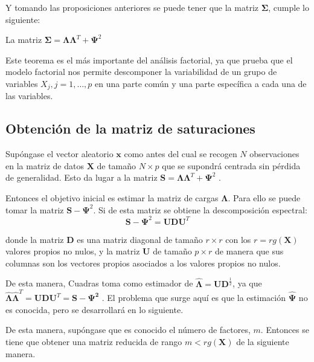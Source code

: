 \noindent Y tomando las proposiciones anteriores se puede tener que la matriz $\mathbf{\Sigma}$, cumple lo siguiente:
\begin{teorema}\label{Descomposición Varianza}
La matriz $\mathbf{\Sigma}=\mathbf{\Lambda}\mathbf{\Lambda}^T+\mathbf{\Psi}^2$
\end{teorema}

\noindent Este teorema es el más importante del análisis factorial, ya que   prueba que el modelo factorial nos permite descomponer la variabilidad de un grupo de variables $X_j,j=1, \ldots , p$ en una parte común y una parte específica a cada una de las variables. 

\subsection{Obtención de la matriz de saturaciones}
\noindent Supóngase el vector aleatorio $\mathbf{x}$ como antes del cual se recogen $N$ observaciones en la matriz de datos $\mathbf{X}$ de tamaño $N\times p$ que se supondrá centrada sin pérdida de generalidad. Esto da lugar a la matriz $\mathbf{S}=\mathbf{\Lambda}\mathbf{\Lambda}^T+\mathbf{\Psi}^2$ \cite{Peña 2002}. 

\noindent Entonces el objetivo inicial es estimar la matriz de cargas $\mathbf{\Lambda}$. Para ello se puede tomar la matriz $\mathbf{S}-\mathbf{\Psi}^2$. Si de esta matriz se obtiene la descomposición espectral:
\begin{equation}
\mathbf{S}-\mathbf{\Psi}^2=\mathbf{U}\mathbf{D}\mathbf{U}^T
\end{equation}

\noindent donde la matriz $\mathbf{D}$ es una matriz diagonal de tamaño $r\times r$ con los $r=rg(\mathbf{X})$ valores propios no nulos, y la matriz $\mathbf{U}$ de tamaño $p\times r$ de manera que sus columnas son los vectores propios asociados a los valores propios no nulos. 

\noindent De esta manera, Cuadras  toma como estimador de $\mathbf{\hat{\Lambda}}=\mathbf{UD}^{\frac{1}{2}}$, ya que \\ $\mathbf{\hat{\Lambda}}\mathbf{\hat{\Lambda}}^T=\mathbf{U}\mathbf{D}\mathbf{U}^T= \mathbf{S-\Psi^2}$ \cite{Cuadras 2014}. El problema que surge aquí es que la estimación $\mathbf{\hat{\Psi}}$ no es conocida, pero se desarrollará en lo siguiente. 

\noindent De esta manera, supóngase que es conocido el número de factores, $m$. Entonces se tiene que obtener una matriz reducida de rango $m<rg(\mathbf{X})$ de la siguiente manera. 

